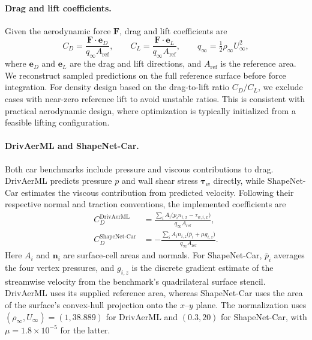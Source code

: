 \paragraph{Drag and lift coefficients.}
Given the aerodynamic force $\mathbf{F}$, drag and lift coefficients are
\begin{equation}
    C_D=\frac{\mathbf{F}\!\cdot\mathbf{e}_D}{q_\infty A_{\mathrm{ref}}},
    \qquad
    C_L=\frac{\mathbf{F}\!\cdot\mathbf{e}_L}{q_\infty A_{\mathrm{ref}}},
    \qquad
    q_\infty=\tfrac12\rho_\infty U_\infty^2,
    \label{eq:app_aerodynamic_coefficients}
\end{equation}
where $\mathbf{e}_D$ and $\mathbf{e}_L$ are the drag and lift directions, and $A_{\mathrm{ref}}$ is the reference area. We reconstruct sampled predictions on the full reference surface before force integration. For density design based on the drag-to-lift ratio \(C_D/C_L\), we exclude cases with near-zero reference lift to avoid unstable ratios. This is consistent with practical aerodynamic design, where optimization is typically initialized from a feasible lifting configuration.

\paragraph{DrivAerML and ShapeNet-Car.}
Both car benchmarks include pressure and viscous contributions to drag. DrivAerML predicts pressure $p$ and wall shear stress $\boldsymbol{\tau}_w$ directly, while ShapeNet-Car estimates the viscous contribution from predicted velocity. Following their respective normal and traction conventions, the implemented coefficients are
\begin{equation}
    \begin{aligned}
        C_D^{\mathrm{DrivAerML}}
        &=\frac{\sum_i A_i\bigl(p_i n_{i,x}-\tau_{w,i,x}\bigr)}
                {q_\infty A_{\mathrm{ref}}},\\
        C_D^{\mathrm{ShapeNet\text{-}Car}}
        &=-\frac{\sum_i A_i n_{i,z}\bigl(\bar p_i+\mu g_{i,z}\bigr)}
                 {q_\infty A_{\mathrm{ref}}}.
    \end{aligned}
    \label{eq:app_car_drag}
\end{equation}
Here $A_i$ and $\mathbf{n}_i$ are surface-cell areas and normals. For ShapeNet-Car, $\bar p_i$ averages the four vertex pressures, and $g_{i,z}$ is the discrete gradient estimate of the streamwise velocity from the benchmark's quadrilateral surface stencil. DrivAerML uses its supplied reference area, whereas ShapeNet-Car uses the area of the surface's convex-hull projection onto the $x$--$y$ plane. The normalization uses $(\rho_\infty,U_\infty)=(1,38.889)$ for DrivAerML and $(0.3,20)$ for ShapeNet-Car, with $\mu=1.8\times10^{-5}$ for the latter.


